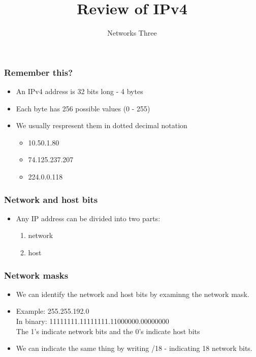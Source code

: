\documentclass[10pt]{beamer}
\title{Review of IPv4}
\author[IN715]{Networks Three}
\institute[Otago Polytechnic]{
  Otago Polytechnic \\
  Dunedin, New Zealand \\
}
\date{}
\begin{document}
\begin{frame}[plain]
  \titlepage
\end{frame}

\begin{frame}
  \frametitle{Remember this?}

 \begin{itemize}
  \item An IPv4 address is 32 bits long - 4 bytes
  \item Each byte has 256 possible values (0 - 255)
  \item We usually respresent them in dotted decimal notation 
        \begin{itemize}
          \item 10.50.1.80
          \item 74.125.237.207
          \item 224.0.0.118
        \end{itemize}
  \end{itemize}

\end{frame}


\begin{frame}
  \frametitle{Network and host bits}

 \begin{itemize}
  \item Any IP address can be divided into two parts:
        \begin{enumerate}
          \item network
          \item host
        \end{enumerate}
  
 \end{itemize}

\end{frame}


\begin{frame}
  \frametitle{Network masks}
 \begin{itemize}
  \item We can identify the network and host bits by examinng the network mask.
  \item Example: 255.255.192.0 \\
        In binary:  11111111.11111111.11000000.00000000 \\
        The 1's indicate network bits and the 0's indicate host bits
  \item We can indicate the same thing by writing /18 - indicating 18 network bits.
 \end{itemize}

\end{frame}
\end{document}
